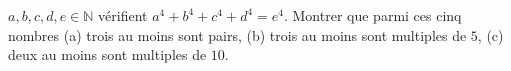 $a, b, c, d, e \in \mathbb{N}$ vérifient $a^4 + b^4 + c^4 + d^4 = e^4$. Montrer que parmi ces cinq nombres (a) trois au moins sont pairs, (b) trois au moins sont multiples de $5$, (c) deux au moins sont multiples de $10$.
